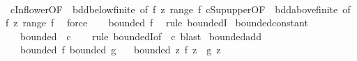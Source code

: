 \begin{isabellebody}
\ \ \ \ \isamarkupfalse%
\ cInf{\isacharunderscore}{\kern0pt}lower{\isacharbrackleft}{\kern0pt}OF\ {\isacharunderscore}{\kern0pt}\ bdd{\isacharunderscore}{\kern0pt}below{\isacharunderscore}{\kern0pt}finite{\isacharcomma}{\kern0pt}\ of\ {\isachardoublequoteopen}f\ z{\isachardoublequoteclose}\ {\isachardoublequoteopen}range\ f{\isachardoublequoteclose}{\isacharbrackright}{\kern0pt}\ cSup{\isacharunderscore}{\kern0pt}upper{\isacharbrackleft}{\kern0pt}OF\ {\isacharunderscore}{\kern0pt}\ bdd{\isacharunderscore}{\kern0pt}above{\isacharunderscore}{\kern0pt}finite{\isacharcomma}{\kern0pt}\ of\ {\isachardoublequoteopen}f\ z{\isachardoublequoteclose}\ {\isachardoublequoteopen}range\ f{\isachardoublequoteclose}{\isacharbrackright}{\kern0pt}\ \isamarkupfalse%
\ force\isanewline
\ \ \isamarkupfalse%
\ {\isachardoublequoteopen}bounded\ f{\isachardoublequoteclose}\ \isamarkupfalse%
\ {\isacharparenleft}{\kern0pt}rule\ boundedI{\isacharparenright}{\kern0pt}\isanewline
{}\isamarkupfalse%
%
\endisatagproof
{\isafoldproof}%
%
\isadelimproof
\isanewline
%
\endisadelimproof
\isanewline
{}\isamarkupfalse%
\ bounded{\isacharunderscore}{\kern0pt}constant{\isacharcolon}{\kern0pt}\isanewline
\ \ \ {\isachardoublequoteopen}bounded\ {\isacharparenleft}{\kern0pt}{\isasymlambda}{\isacharunderscore}{\kern0pt}{\isachardot}{\kern0pt}\ c{\isacharparenright}{\kern0pt}{\isachardoublequoteclose}\isanewline
%
\isadelimproof
\ \ %
\endisadelimproof
%
\isatagproof
{}\isamarkupfalse%
\ {\isacharparenleft}{\kern0pt}rule\ boundedI{\isacharbrackleft}{\kern0pt}of\ {\isacharunderscore}{\kern0pt}\ {\isachardoublequoteopen}{\isasymbar}c{\isasymbar}{\isachardoublequoteclose}{\isacharbrackright}{\kern0pt}{\isacharcomma}{\kern0pt}\ blast{\isacharparenright}{\kern0pt}%
\endisatagproof
{\isafoldproof}%
%
\isadelimproof
\isanewline
%
\endisadelimproof
\isanewline
{}\isamarkupfalse%
\ bounded{\isacharunderscore}{\kern0pt}add{\isacharcolon}{\kern0pt}\isanewline
\ \ \ {\isachardoublequoteopen}bounded\ f{\isachardoublequoteclose}\ {\isachardoublequoteopen}bounded\ g{\isachardoublequoteclose}\isanewline
\ \ \ {\isachardoublequoteopen}bounded\ {\isacharparenleft}{\kern0pt}{\isasymlambda}z{\isachardot}{\kern0pt}\ f\ z\ {\isacharplus}{\kern0pt}\ g\ z{\isacharparenright}{\kern0pt}{\isachardoublequoteclose}\isanewline
%
\isadelimproof
%
\endisadelimproof
%
\isatagproof
{}\isamarkupfalse%
\ {\isacharminus}{\kern0pt}\isanewline

\end{isabellebody}
